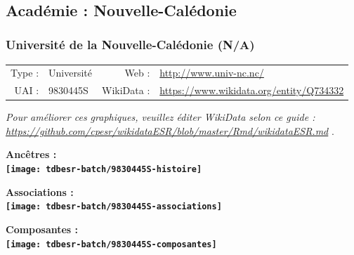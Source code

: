 \documentclass[12pt,french,]{article}
\begin{document}
\ifoddpage \fi ~\newpage  

\hypertarget{acaduxe9mie-nouvelle-caluxe9donie}{%
\subsection{Académie :
Nouvelle-Calédonie}\label{acaduxe9mie-nouvelle-caluxe9donie}}

\hypertarget{universituxe9-de-la-nouvelle-caluxe9donie-na}{%
\subsubsection{Université de la Nouvelle-Calédonie
(N/A)}\label{universituxe9-de-la-nouvelle-caluxe9donie-na}}

\begin{tabular*}{\textwidth}{rp{5cm}rl}  
\hline  
Type : & Université & Web : &\href{http://www.univ-nc.nc/}{http://www.univ-nc.nc/} \\  
UAI : & 9830445S & WikiData : & \href{https://www.wikidata.org/entity/Q734332}{https://www.wikidata.org/entity/Q734332} \\  
\hline  
\end{tabular*}

\textit{\scriptsize Pour améliorer ces graphiques, veuillez éditer WikiData selon ce guide :  \href{https://github.com/cpesr/wikidataESR/blob/master/Rmd/wikidataESR.md}{https://github.com/cpesr/wikidataESR/blob/master/Rmd/wikidataESR.md}}
.

\vspace{1cm}  
\begin{minipage}[b]{0.50\textwidth}\begin{center} \bf Ancêtres : \\  
\texttt{[image: tdbesr-batch/9830445S-histoire]} \end{center}\end{minipage}\begin{minipage}[b]{0.50\textwidth}\begin{center} \bf Associations : \\  
\texttt{[image: tdbesr-batch/9830445S-associations]} \end{center}\end{minipage}

\hrulefill

\begin{center} \bf Composantes : \\  
\texttt{[image: tdbesr-batch/9830445S-composantes]} \end{center}
\end{document}
